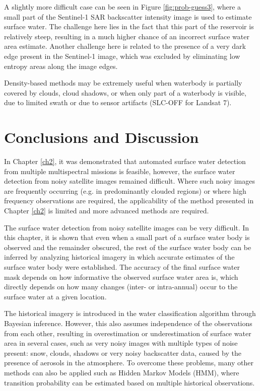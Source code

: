 A slightly more difficult case can be seen in Figure \ref{fig:prob-guess3}, where a small part of the Sentinel-1 SAR backscatter intensity image is used to estimate surface water. The challenge here lies in the fact that this part of the reservoir is relatively steep, resulting in a much higher chance of an incorrect surface water area estimate. Another challenge here is related to the presence of a very dark edge present in the Sentinel-1 image, which was excluded by eliminating low entropy areas along the image edges. 

Density-based methods may be extremely useful when waterbody is partially covered by clouds, cloud shadows, or when only part of a waterbody is visible, due to limited swath or due to sensor artifacts (SLC-OFF for Landsat 7). 

\section{Conclusions and Discussion}

In Chapter \ref{ch2}, it was demonstrated that automated surface water detection from multiple multispectral missions is feasible, however, the surface water detection from noisy satellite images remained difficult. Where such noisy images are frequently occurring (e.g. in predominantly clouded regions) or where high frequency observations are required, the applicability of the method presented in Chapter \ref{ch2} is limited and more advanced methods are required. 

The surface water detection from noisy satellite images can be very difficult. In this chapter, it is shown that even when a small part of a surface water body is observed and the remainder obscured, the rest of the surface water body can be inferred by analyzing historical imagery in which accurate estimates of the surface water body were established. The accuracy of the final surface water mask depends on how informative the observed surface water area is, which directly depends on how many changes (inter- or intra-annual) occur to the surface water at a given location.

The historical imagery is introduced in the water classification algorithm through Bayesian inference. However, this also assumes independence of the observations from each other, resulting in overestimation or underestimation of surface water area in several cases, such as very noisy images with multiple types of noise present: snow, clouds, shadows or very noisy backscatter data, caused by the presence of aerosols in the atmosphere. To overcome these problems, many other methods can also be applied such as Hidden Markov Models (HMM), where transition probability can be estimated based on multiple historical observations.

